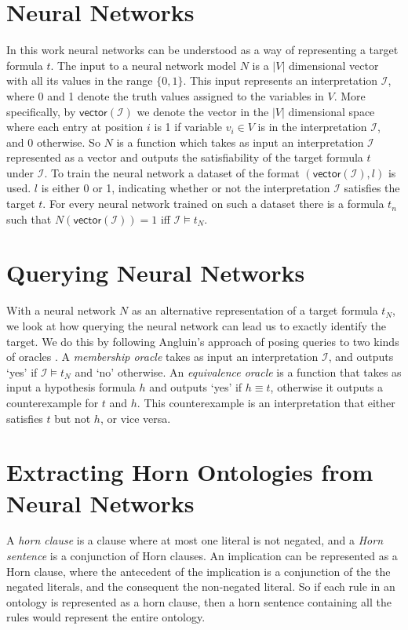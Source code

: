 \section{Neural Networks}
In this work neural networks can be understood as a way of representing a target formula $t$. The input to a neural network model $N$ is a $|V|$ dimensional vector with all its values in the range $\{0, 1\}$. This input represents an interpretation $\mathcal{I}$, where 0 and 1 denote the truth values assigned to the variables in $V$. More specifically, by $\mathsf{vector}(\mathcal{I})$ we denote the vector in the $|V|$ dimensional space where each entry at position $i$ is 1 if variable $v_i \in V$ is in the interpretation $\mathcal{I}$, and 0 otherwise. So $N$ is a function which takes as input an interpretation $\mathcal{I}$ represented as a vector and outputs the satisfiability of the target formula $t$ under $\mathcal{I}$.
To train the neural network a dataset of the format $(\mathsf{vector}(\mathcal{I}), l)$ is used. $l$ is either 0 or 1, indicating whether or not the interpretation $\mathcal{I}$ satisfies the target $t$. For every neural network trained on such a dataset there is a formula $t_n$ such that $N(\mathsf{vector}(\mathcal{I})) = 1$ iff $\mathcal{I} \models t_N$.


\section{Querying Neural Networks}

With a neural network $N$ as an alternative representation of a target formula $t_N$, we look at how querying the neural network can lead us to exactly identify the target. We do this by following Angluin's approach of posing queries to two kinds of oracles \cite{DBLP:journals/ml/AngluinFP92}. A \emph{membership oracle} takes as input an interpretation $\mathcal{I}$, and outputs `yes' if $\mathcal{I} \models t_N$ and `no' otherwise. An \emph{equivalence oracle} is a function that takes as input a hypothesis formula $h$ and outputs `yes' if $h \equiv t$, otherwise it outputs a counterexample for $t$ and $h$. This counterexample is an interpretation that either satisfies $t$ but not $h$, or vice versa.


\section{Extracting Horn Ontologies from Neural Networks}
A \emph{horn clause} is a clause where at most one literal is not negated, and a \emph{Horn sentence} is a conjunction of Horn clauses. An implication can be represented as a Horn clause, where the antecedent of the implication is a conjunction of the the negated literals, and the consequent the non-negated literal. So if each rule in an ontology is represented as a horn clause, then a horn sentence containing all the rules would represent the entire ontology.

